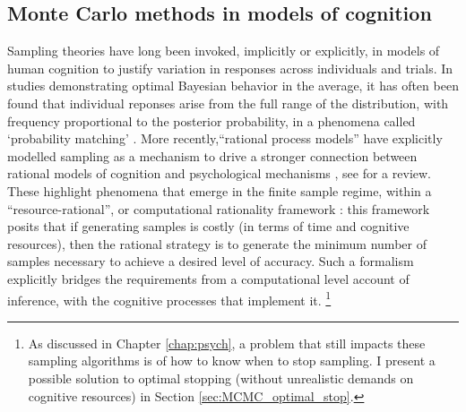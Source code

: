 \subsection{Monte Carlo methods in models of cognition}

Sampling theories have long been invoked, implicitly or explicitly, in models of human cognition to justify variation in responses across individuals and trials. In studies demonstrating optimal Bayesian behavior in the average, it has often been found that individual reponses arise from the full range of the distribution, with frequency proportional to the posterior probability, in a phenomena called `probability matching' \citep{wozny2010,Denison2013,Moreno11,Vul2014}. More recently,``rational process models'' have explicitly modelled sampling as a mechanism to drive a stronger connection between rational models of cognition and psychological mechanisms \cite{griffiths2012bridging, Vul2014, shi10, sanborn2010rational, Lieder2013}, see \citet{sanborn2016bayesian} for a review. These highlight phenomena that emerge in the finite sample regime, within a ``resource-rational'', or computational rationality framework \citep{Vul2014,griffiths2015,Gershman2015,schulz2016simple}: this framework posits that if generating samples is costly (in terms of time and cognitive resources), then the rational strategy is to generate the minimum number of samples necessary to achieve a desired level of accuracy. Such a formalism explicitly bridges the requirements from a computational level account of inference, with the cognitive processes that implement it. \footnote{As discussed in Chapter \ref{chap:psych}, a problem that still impacts these sampling algorithms is of how to know when to stop sampling. I present a possible solution to optimal stopping (without unrealistic demands on cognitive resources) in Section \ref{sec:MCMC_optimal_stop}.}

